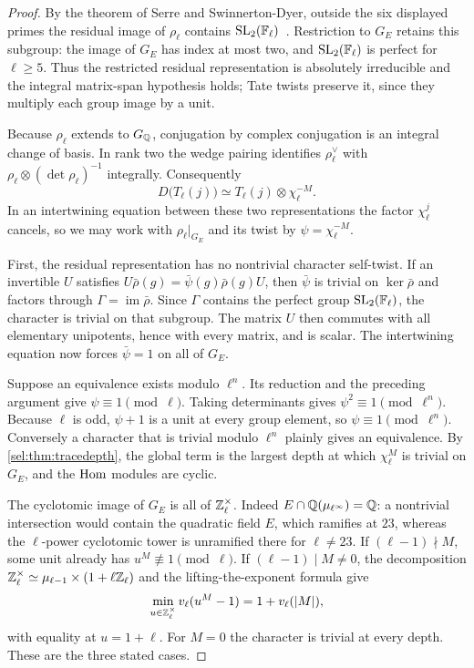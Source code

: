 \begin{proof}
By the theorem of Serre and Swinnerton-Dyer, outside the six displayed
primes the residual image of $\rho_\ell$ contains
$\operatorname{SL}_2(\mathbb{F}_\ell)$~\cite{SwinnertonDyer1973Ladic,Edixhoven2007Computation}.
Restriction to $G_E$ retains this subgroup: the image of $G_E$ has index at
most two, and $\operatorname{SL}_2(\mathbb{F}_\ell)$ is perfect for $\ell\ge5$. Thus the
restricted residual representation is absolutely irreducible and the
integral matrix-span hypothesis holds; Tate twists preserve it, since they
multiply each group image by a unit.

Because $\rho_\ell$ extends to $G_{\mathbb{Q}}$, conjugation by complex conjugation
is an integral change of basis. In rank two the wedge pairing identifies
$\rho_\ell^\vee$ with $\rho_\ell\otimes(\det\rho_\ell)^{-1}$ integrally.
Consequently
\[
 D\bigl(T_\ell(j)\bigr)\simeq T_\ell(j)\otimes\chi_\ell^{-M}.
\]
In an intertwining equation between these two representations the factor
$\chi_\ell^j$ cancels, so we may work with $\rho_\ell|_{G_E}$ and its twist
by $\psi=\chi_\ell^{-M}$.

First, the residual representation has no nontrivial character self-twist.
If an invertible $U$ satisfies
$U\bar\rho(g)=\bar\psi(g)\bar\rho(g)U$, then $\bar\psi$ is trivial on
$\ker\bar\rho$ and factors through $\Gamma=\operatorname{im}\bar\rho$.
Since $\Gamma$ contains the perfect group $\operatorname{SL}_2(\mathbb{F}_\ell)$, the character is
trivial on that subgroup. The matrix $U$ then commutes with all elementary
unipotents, hence with every matrix, and is scalar. The intertwining
equation now forces $\bar\psi=1$ on all of $G_E$.

Suppose an equivalence exists modulo $\ell^n$. Its reduction and the
preceding argument give $\psi\equiv1\pmod\ell$. Taking determinants gives
$\psi^2\equiv1\pmod{\ell^n}$. Because $\ell$ is odd, $\psi+1$ is a unit at
every group element, so $\psi\equiv1\pmod{\ell^n}$. Conversely a character
that is trivial modulo $\ell^n$ plainly gives an equivalence. By
\cref{sel:thm:tracedepth}, the global term is the largest depth at which
$\chi_\ell^M$ is trivial on $G_E$, and the $\operatorname{Hom}$ modules are cyclic.

The cyclotomic image of $G_E$ is all of $\mathbb{Z}_\ell^\times$. Indeed
$E\cap\mathbb{Q}(\mu_{\ell^\infty})=\mathbb{Q}$: a nontrivial intersection would contain the
quadratic field $E$, which ramifies at $23$, whereas the $\ell$-power
cyclotomic tower is unramified there for $\ell\ne23$. If $(\ell-1)\nmid M$,
some unit already has $u^M\not\equiv1\pmod\ell$. If $(\ell-1)\mid M\ne0$,
the decomposition
$\mathbb{Z}_\ell^\times\simeq\mu_{\ell-1}\times(1+\ell\mathbb{Z}_\ell)$ and the
lifting-the-exponent formula give
\[
 \min_{u\in\mathbb{Z}_\ell^\times}v_\ell(u^M-1)=1+v_\ell(\lvert M\rvert),
\]
with equality at $u=1+\ell$. For $M=0$ the character is trivial at every
depth. These are the three stated cases.


\end{proof}
